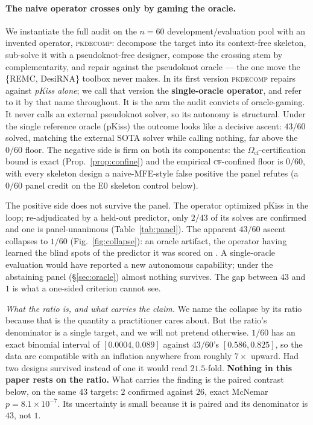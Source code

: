 \documentclass[11pt]{article}
\newcommand{\CF}{\textsc{cf}}
\newcommand{\Ocf}{\ensuremath{\Omega_{\mathrm{cf}}}}
\begin{document}
\paragraph{The naive operator crosses only by gaming the oracle.} We instantiate the full audit on
the $n=60$ development/evaluation pool with an invented operator, \textsc{pkdecomp}: decompose the target into
its context-free skeleton, sub-solve it with a pseudoknot-free designer, compose the crossing stem by
complementarity, and repair against the pseudoknot oracle --- the one move the \{REMC, DesiRNA\} toolbox never
makes. In its first version \textsc{pkdecomp} repairs against \emph{pKiss alone}; we call that version the
\textbf{single-oracle operator}, and refer to it by that name throughout. It is the arm the audit
convicts of oracle-gaming. It never calls an external pseudoknot solver, so its autonomy is structural. Under the single
reference oracle (pKiss) the outcome looks like a decisive ascent: $43/60$ solved, matching the external SOTA solver while calling nothing, far above the $0/60$
floor. The negative side is firm on both its components: the $\Ocf$-certification bound is exact (Prop.~\ref{prop:confine})
and the empirical \CF-confined floor is $0/60$, with every skeleton design a naive-MFE-style false positive the
panel refutes (a $0/60$ panel credit on the E0 skeleton control below).

The positive side does not survive the panel. The operator optimized pKiss in the loop; re-adjudicated by
a held-out predictor, only $2/43$ of its solves are confirmed and one is panel-unanimous
(Table~\ref{tab:panel}). The apparent $43/60$ ascent collapses to
$1/60$ (Fig.~\ref{fig:collapse}): an oracle artifact, the operator having learned the blind spots of the predictor it was scored on
\citep{skalse2022,gao2023overopt}. A single-oracle evaluation would have reported a new autonomous
capability; under the abstaining panel (\S\ref{sec:oracle}) almost nothing survives. The gap between $43$
and $1$ is what a one-sided criterion cannot see.

\emph{What the ratio is, and what carries the claim.} We name the collapse by its ratio because that is the quantity a practitioner cares about. But the ratio's
denominator is a single target, and we will not pretend otherwise. $1/60$ has an exact binomial interval of $[0.0004,0.089]$ against $43/60$'s $[0.586,0.825]$, so the
data are compatible with an inflation anywhere from roughly $7\times$ upward. Had two designs survived instead
of one it would read $21.5$-fold. \textbf{Nothing in this paper rests on the ratio.} What carries the finding is the paired contrast below, on the same $43$ targets: $2$ confirmed against $26$,
exact McNemar $p{=}8.1\!\times\!10^{-7}$. Its uncertainty is small because it is paired and its denominator is
$43$, not $1$.
\end{document}
